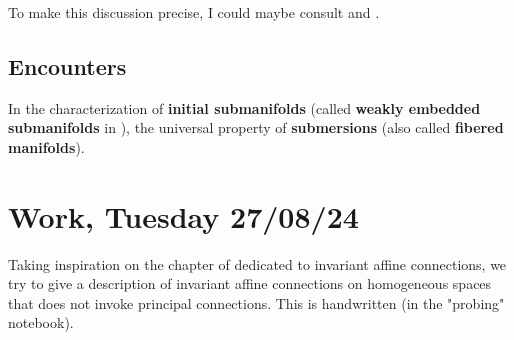 \documentclass[a4paper,12pt,parskip=half*,chapterprefix=true,numbers=noendperiod]{scrreprt}
\theoremstyle{definition}
\theoremstyle{remark}
\begin{document}
To make this discussion precise, I could maybe consult \cite{KMS:NatDiffGeo} and \cite{vakar:BundlesGauges}.

\subsection{Encounters}

In \cite{KMS:NatDiffGeo} the characterization of \textbf{initial submanifolds} (called \textbf{weakly embedded submanifolds} in \cite{Lee:IntSmMan}), the universal property of \textbf{submersions} (also called \textbf{fibered manifolds}).

\section{Work, Tuesday 27/08/24}

Taking inspiration on the chapter of \cite{KN:FundDiffGeo} dedicated to invariant affine connections, we try to give a description of invariant affine connections on homogeneous spaces that does not invoke principal connections. This is handwritten \cite{personalHand:Connections} (in the "probing" notebook).



\printbibliography
\end{document}
